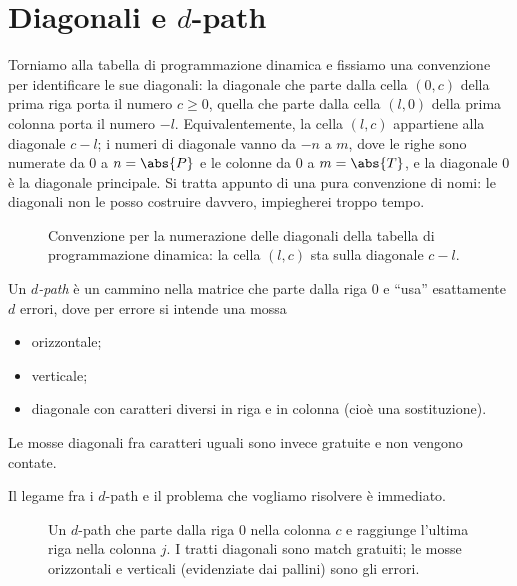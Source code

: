 \section{Diagonali e \texorpdfstring{$d$}{d}-path}

Torniamo alla tabella di programmazione dinamica e fissiamo una convenzione per
identificare le sue diagonali: la diagonale che parte dalla cella $(0,c)$ della
prima riga porta il numero $c\ge 0$, quella che parte dalla cella $(l,0)$ della
prima colonna porta il numero $-l$. Equivalentemente, la cella $(l,c)$
appartiene alla diagonale $c-l$; i numeri di diagonale vanno da $-n$ a $m$, dove
le righe sono numerate da $0$ a $n=\abs{P}$ e le colonne da $0$ a $m=\abs{T}$, e
la diagonale $0$ è la diagonale principale. Si tratta appunto di una pura
convenzione di nomi: le diagonali non le posso costruire davvero, impiegherei
troppo tempo.

\begin{figure}[H]
  \centering
  
  \caption{Convenzione per la numerazione delle diagonali della tabella di
  programmazione dinamica: la cella $(l,c)$ sta sulla diagonale $c-l$.}
  \label{fig:diagonali-numerate}
\end{figure}

\begin{definizione}[$d$-path]
\label{def:dpath}
  Un \emph{$d$-path} è un cammino nella matrice che parte dalla riga $0$ e
  ``usa'' esattamente $d$ errori, dove per errore si intende una mossa
  \begin{itemize}
    \item orizzontale;
    \item verticale;
    \item diagonale con caratteri diversi in riga e in colonna (cioè una
          sostituzione).
  \end{itemize}
  Le mosse diagonali fra caratteri uguali sono invece gratuite e non vengono
  contate.
\end{definizione}

Il legame fra i $d$-path e il problema che vogliamo risolvere è immediato.

\begin{figure}[H]
  \centering
  
  \caption{Un $d$-path che parte dalla riga $0$ nella colonna $c$ e raggiunge
  l'ultima riga nella colonna $j$. I tratti diagonali sono match gratuiti; le
  mosse orizzontali e verticali (evidenziate dai pallini) sono gli errori.}
  \label{fig:lv-dpath-riga-n}
\end{figure}

